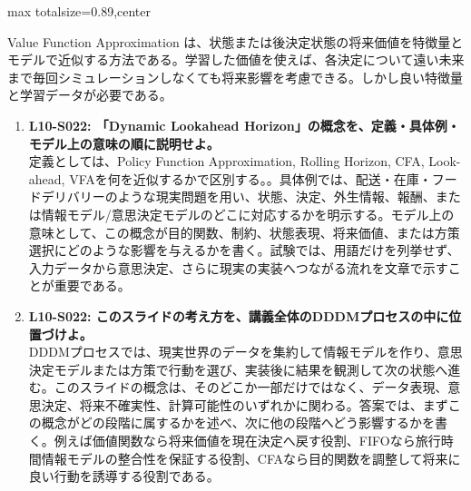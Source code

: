\begin{minipage}[t]{0.58\textwidth}
\begin{adjustbox}{max totalsize={\textwidth}{0.89\textheight},center}
\begin{minipage}{\textwidth}
Value Function Approximation は、状態または後決定状態の将来価値を特徴量とモデルで近似する方法である。学習した価値を使えば、各決定について遠い未来まで毎回シミュレーションしなくても将来影響を考慮できる。しかし良い特徴量と学習データが必要である。\par{}\begin{enumerate}\item \textbf{L10-S022: 「Dynamic Lookahead Horizon」の概念を、定義・具体例・モデル上の意味の順に説明せよ。}\\定義としては、Policy Function Approximation, Rolling Horizon, CFA, Look-ahead, VFAを何を近似するかで区別する。。具体例では、配送・在庫・フードデリバリーのような現実問題を用い、状態、決定、外生情報、報酬、または情報モデル/意思決定モデルのどこに対応するかを明示する。モデル上の意味として、この概念が目的関数、制約、状態表現、将来価値、または方策選択にどのような影響を与えるかを書く。試験では、用語だけを列挙せず、入力データから意思決定、さらに現実の実装へつながる流れを文章で示すことが重要である。\item \textbf{L10-S022: このスライドの考え方を、講義全体のDDDMプロセスの中に位置づけよ。}\\DDDMプロセスでは、現実世界のデータを集約して情報モデルを作り、意思決定モデルまたは方策で行動を選び、実装後に結果を観測して次の状態へ進む。このスライドの概念は、そのどこか一部だけではなく、データ表現、意思決定、将来不確実性、計算可能性のいずれかに関わる。答案では、まずこの概念がどの段階に属するかを述べ、次に他の段階へどう影響するかを書く。例えば価値関数なら将来価値を現在決定へ戻す役割、FIFOなら旅行時間情報モデルの整合性を保証する役割、CFAなら目的関数を調整して将来に良い行動を誘導する役割である。\end{enumerate}
\end{minipage}
\end{adjustbox}
\end{minipage}


